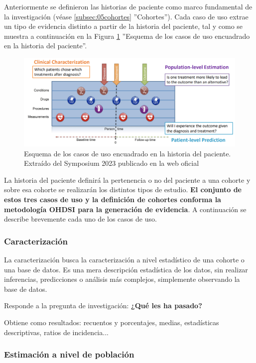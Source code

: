 Anteriormente se definieron las historias de paciente como marco fundamental de la investigación (véase \ref{subsec:05cohortes} ''Cohortes''). Cada caso de uso extrae un tipo de evidencia distinto a partir de la historia del paciente, tal y como se muestra a continuación en la Figura \ref{fig:useCasesJourney} ''Esquema de los casos de uso encuadrado en la historia del paciente''.


\begin{figure}[H]
\centering
\includegraphics[width=1\textwidth]{figures/useCasesJourney.png}
     \caption{Esquema de los casos de uso encuadrado en la historia del paciente. Extraído del Symposium 2023 publicado en la web oficial \cite{OHDSIwebsite}}
    \label{fig:useCasesJourney}
\end{figure}

La historia del paciente definirá la pertenencia o no del paciente a una cohorte y sobre esa cohorte se realizarán los distintos tipos de estudio. \textbf{El conjunto de estos tres casos de uso y la definición de cohortes conforma la metodología OHDSI para la generación de evidencia}. A continuación se describe brevemente cada uno de los casos de uso. 

\subsubsection{Caracterización}

La caracterización busca la caracterización a nivel estadístico de una cohorte o una base de datos. Es una mera descripción estadística de los datos, sin realizar inferencias, predicciones o análisis más complejos, simplemente observando la base de datos.

Responde a la pregunta de investigación: \textbf{¿Qué les ha pasado?}

Obtiene como resultados: recuentos y porcentajes, medias, estadísticas descriptivas, ratios de incidencia...

\subsubsection{Estimación a nivel de población}

